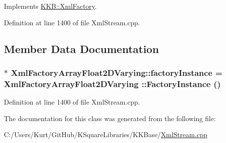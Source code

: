 Implements \hyperlink{class_k_k_b_1_1_xml_factory_a3f4b4f19dee1905e1758b16c66d0112a}{K\+K\+B\+::\+Xml\+Factory}.



Definition at line 1400 of file Xml\+Stream.\+cpp.



\subsection{Member Data Documentation}
\subsubsection[{\texorpdfstring{factory\+Instance}{factoryInstance}}]{ $\ast$ Xml\+Factory\+Array\+Float2\+D\+Varying\+::factory\+Instance = {\bf Xml\+Factory\+Array\+Float2\+D\+Varying} \+::{\bf Factory\+Instance} ()\hspace{0.3cm}{\ttfamily [static]}}\hypertarget{class_xml_factory_array_float2_d_varying_a1c78e767c7568652894d0b522c08b48f}{}\label{class_xml_factory_array_float2_d_varying_a1c78e767c7568652894d0b522c08b48f}


Definition at line 1400 of file Xml\+Stream.\+cpp.



The documentation for this class was generated from the following file\+:\begin{DoxyCompactItemize}
\item 
C\+:/\+Users/\+Kurt/\+Git\+Hub/\+K\+Square\+Libraries/\+K\+K\+Base/\hyperlink{_xml_stream_8cpp}{Xml\+Stream.\+cpp}\end{DoxyCompactItemize}
